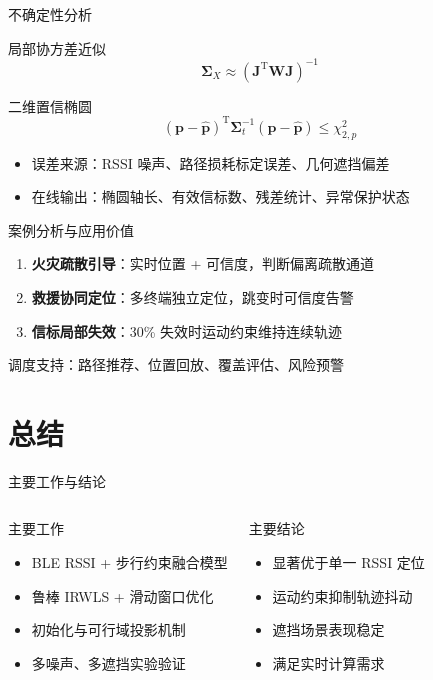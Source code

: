 \documentclass[aspectratio=169]{beamer}
\newcommand{\T}{\mathrm{T}}
\begin{document}
\begin{frame}{不确定性分析}
  \begin{block}{局部协方差近似}
    \[
      \bm\Sigma_X\approx (\bm J^\T\bm W\bm J)^{-1}
    \]
  \end{block}
  \begin{block}{二维置信椭圆}
    \[
      (\bm p-\hat{\bm p})^\T \bm\Sigma_t^{-1}(\bm p-\hat{\bm p})\le \chi^2_{2,p}
    \]
  \end{block}
  \begin{itemize}
    \item 误差来源：RSSI 噪声、路径损耗标定误差、几何遮挡偏差
    \item 在线输出：椭圆轴长、有效信标数、残差统计、异常保护状态
  \end{itemize}
\end{frame}

\begin{frame}{案例分析与应用价值}
  \begin{enumerate}
    \setlength{\itemsep}{6pt}
    \item \textbf{火灾疏散引导}：实时位置 + 可信度，判断偏离疏散通道
    \item \textbf{救援协同定位}：多终端独立定位，跳变时可信度告警
    \item \textbf{信标局部失效}：30\% 失效时运动约束维持连续轨迹
  \end{enumerate}
  \vspace{4mm}
  调度支持：路径推荐、位置回放、覆盖评估、风险预警
\end{frame}

\section{总结}

\begin{frame}{主要工作与结论}
  \begin{columns}[T]
    \begin{block}{主要工作}
      \begin{itemize}
        \setlength{\itemsep}{4pt}
        \item BLE RSSI + 步行约束融合模型
        \item 鲁棒 IRWLS + 滑动窗口优化
        \item 初始化与可行域投影机制
        \item 多噪声、多遮挡实验验证
      \end{itemize}
    \end{block}
    \begin{block}{主要结论}
      \begin{itemize}
        \setlength{\itemsep}{4pt}
        \item 显著优于单一 RSSI 定位
        \item 运动约束抑制轨迹抖动
        \item 遮挡场景表现稳定
        \item 满足实时计算需求
      \end{itemize}
    \end{block}
  \end{columns}
\end{frame}
\end{document}
